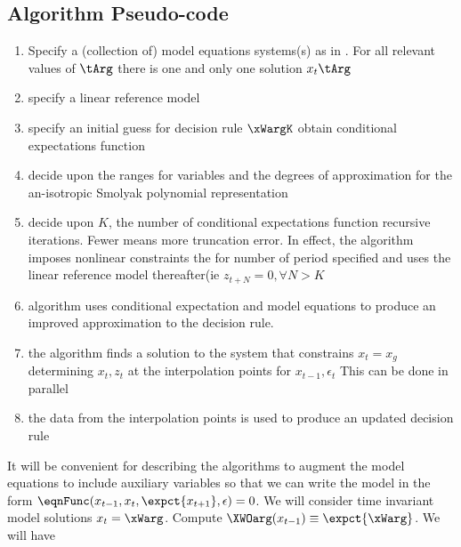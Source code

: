 \documentclass[12pt]{article}
\begin{document}
\subsection{Algorithm Pseudo-code}
\label{sec:pseudocode}

\begin{enumerate}
\item Specify a (collection of) model equations systems(s) 
as in .
For all relevant values of $\tArg$ there is one and only one solution $x_t\tArg$
\item specify a linear reference model
\item specify an initial guess for decision rule $\xWargK$ obtain conditional expectations function
\item decide upon the ranges for variables and the degrees of approximation for the an-isotropic Smolyak polynomial representation
\item decide upon $K$, the number of conditional expectations function recursive iterations.  Fewer means more truncation error. In effect, 
the algorithm imposes nonlinear constraints the for number of period specified 
and uses the linear reference model thereafter(ie $z_{t+N}=0, \forall N>K$
\item algorithm uses conditional expectation and model equations to produce an improved approximation to the decision rule.
\item the algorithm finds a solution to the system that constrains $x_t= x_g$ determining $x_t,z_t$ at the interpolation points for $x_{t-1},\epsilon_t$  This can be done in parallel
\item the data from the interpolation points is used to produce an updated decision rule
\end{enumerate}



It will be convenient for describing the algorithms to
 augment the model equations to include auxiliary variables so that we can write the model in the form
$  \eqnFunc(x_{t-1},x_t,\expct{x_{t+1}},\epsilon)=0$.  We will consider time invariant model solutions $x_t=\xWarg$.  Compute $\XWOarg(x_{t-1})\equiv \expct{\xWarg}$. We will have
\end{document}
